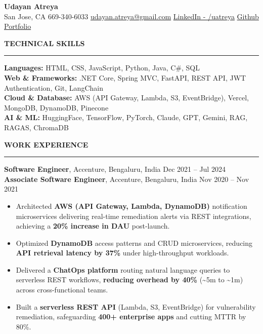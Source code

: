 \documentclass[letterpaper,10.5pt]{extarticle}
\newcommand{\resumesection}[1]{%
    \vspace{6pt}%
    \noindent\textbf{#1}\vspace{-5pt}%
    \\\noindent\rule{\textwidth}{0.5pt}%
    \vspace{1pt}%
}
\begin{document}
\begin{center}
    {\LARGE\textbf{Udayan Atreya}}\\[3pt]
    {\fontsize{11}{13.2}\selectfont
    San Jose, CA \textbar{} 669-340-6033 \textbar{}
    \href{mailto:udayan.atreya@gmail.com}{udayan.atreya@gmail.com} \textbar{}
    \href{https://www.linkedin.com/in/uatreya/}{LinkedIn - /uatreya} \textbar{}
    \href{https://github.com/slowloris-98/}{Github} \textbar{}
    \href{https://udayan-atreya.vercel.app/}{Portfolio}}
\end{center}

\resumesection{TECHNICAL SKILLS}

\noindent\textbf{Languages:} HTML, CSS, JavaScript, Python, Java, C\#, SQL\\
\noindent\textbf{Web \& Frameworks:} .NET Core, Spring MVC, FastAPI, REST API, JWT Authentication, Git, LangChain\\
\noindent\textbf{Cloud \& Database:} AWS (API Gateway, Lambda, S3, EventBridge), Vercel, MongoDB, DynamoDB, Pinecone\\
\noindent\textbf{AI \& ML:} HuggingFace, TensorFlow, PyTorch, Claude, GPT, Gemini, RAG, RAGAS, ChromaDB

\resumesection{WORK EXPERIENCE}

\noindent\textbf{Software Engineer}, Accenture, Bengaluru, India \hfill Dec 2021 -- Jul 2024\\
\textbf{Associate Software Engineer}, Accenture, Bengaluru, India \hfill Nov 2020 -- Nov 2021

\begin{itemize}[leftmargin=12pt, topsep=1pt, itemsep=0pt, parsep=0pt]
    \item Architected \textbf{AWS (API Gateway, Lambda, DynamoDB)} notification microservices delivering real-time remediation alerts via REST integrations, achieving a \textbf{20\% increase in DAU} post-launch.
    \item Optimized \textbf{DynamoDB} access patterns and CRUD microservices, reducing \textbf{API retrieval latency by 37\%} under high-throughput workloads.
    \item Delivered a \textbf{ChatOps platform} routing natural language queries to serverless REST workflows, \textbf{reducing overhead by 40\%} (\textasciitilde5m to \textasciitilde1m) across cross-functional teams.
    \item Built a \textbf{serverless REST API} (Lambda, S3, EventBridge) for vulnerability remediation, safeguarding \textbf{400+ enterprise apps} and cutting MTTR by 80\%.
\end{itemize}
\end{document}
